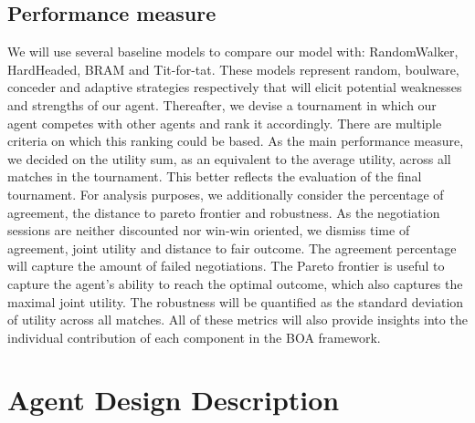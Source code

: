 \documentclass[a4paper,11pt]{article}
\theoremstyle{mytheor}
\begin{document}
\subsection{Performance measure}
We will use several baseline models to compare our model with: RandomWalker, HardHeaded, BRAM and Tit-for-tat.\cite{Baarslag_Hindriks_Jonker_2013}\cite{Krimpen_Looije_Hajizadeh_2013}\cite{Fishel2013} These models represent random, boulware, conceder and adaptive strategies respectively that will elicit potential weaknesses and strengths of our agent. Thereafter, we devise a tournament in which our agent competes with other agents and rank it accordingly. 
There are multiple criteria on which this ranking could be based.\cite{Baarslag2016} As the main performance measure, we decided on the utility sum, as an equivalent to the average utility, across all matches in the tournament. This better reflects the evaluation of the final tournament. For analysis purposes, we additionally consider the percentage of agreement, the distance to pareto frontier and robustness. As the negotiation sessions are neither discounted nor win-win oriented, we dismiss time of agreement, joint utility and distance to fair outcome. The agreement percentage will capture the amount of failed negotiations. The Pareto frontier is useful to capture the agent's ability to reach the optimal outcome, which also captures the maximal joint utility. The robustness will be quantified as the standard deviation of utility across all matches. All of these metrics will also provide insights into the individual contribution of each component in the BOA framework.





\section{Agent Design Description}
\end{document}
